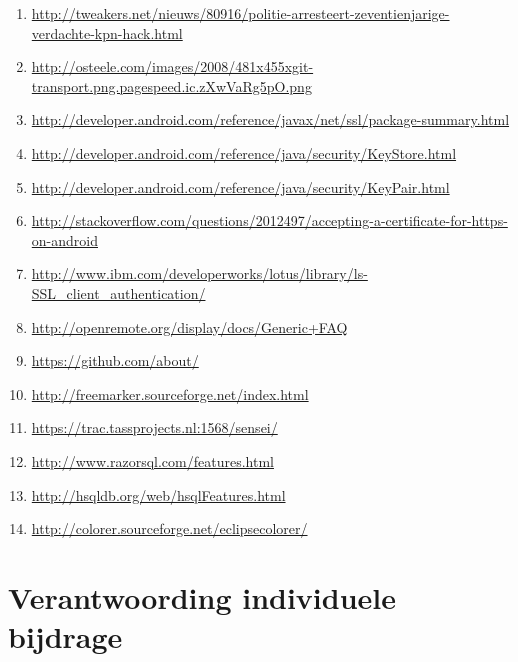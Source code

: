 \documentclass[]{article}
\begin{document}
\begin{enumerate}

    \item \url{http://tweakers.net/nieuws/80916/politie-arresteert-zeventienjarige-verdachte-kpn-hack.html}
    \item \url{http://osteele.com/images/2008/481x455xgit-transport.png.pagespeed.ic.zXwVaRg5pO.png}
    \item \url{http://developer.android.com/reference/javax/net/ssl/package-summary.html}
    \item \url{http://developer.android.com/reference/java/security/KeyStore.html}
    \item \url{http://developer.android.com/reference/java/security/KeyPair.html}
    \item \url{http://stackoverflow.com/questions/2012497/accepting-a-certificate-for-https-on-android}
    \item \url{http://www.ibm.com/developerworks/lotus/library/ls-SSL_client_authentication/}
    \item \url{http://openremote.org/display/docs/Generic+FAQ}
    \item \url{https://github.com/about/}
    \item \url{http://freemarker.sourceforge.net/index.html}
    \item \url{https://trac.tassprojects.nl:1568/sensei/}
    \item \url{http://www.razorsql.com/features.html}
    \item \url{http://hsqldb.org/web/hsqlFeatures.html}
    \item \url{http://colorer.sourceforge.net/eclipsecolorer/}

\end{enumerate}

\newpage
\section{Verantwoording individuele bijdrage}
\label{lastpage}
\end{document}
